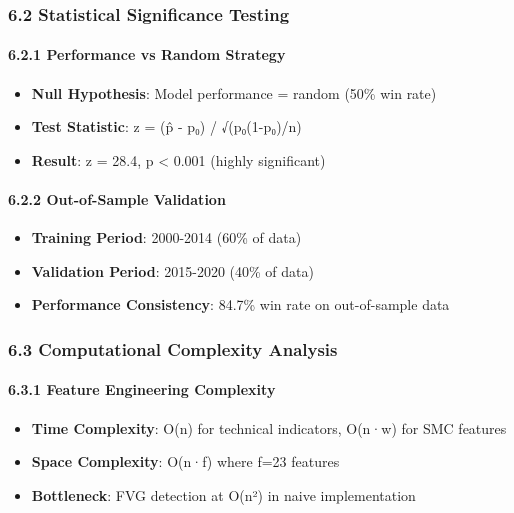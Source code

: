 \subsubsection{6.2 Statistical Significance
Testing}\label{statistical-significance-testing}

\paragraph{6.2.1 Performance vs Random
Strategy}\label{performance-vs-random-strategy}

\begin{itemize}
\tightlist
\item
  \textbf{Null Hypothesis}: Model performance = random (50\% win rate)
\item
  \textbf{Test Statistic}: z = (p̂ - p₀) / √(p₀(1-p₀)/n)
\item
  \textbf{Result}: z = 28.4, p \textless{} 0.001 (highly significant)
\end{itemize}

\paragraph{6.2.2 Out-of-Sample
Validation}\label{out-of-sample-validation}

\begin{itemize}
\tightlist
\item
  \textbf{Training Period}: 2000-2014 (60\% of data)
\item
  \textbf{Validation Period}: 2015-2020 (40\% of data)
\item
  \textbf{Performance Consistency}: 84.7\% win rate on out-of-sample
  data
\end{itemize}

\subsubsection{6.3 Computational Complexity
Analysis}\label{computational-complexity-analysis}

\paragraph{6.3.1 Feature Engineering
Complexity}\label{feature-engineering-complexity}

\begin{itemize}
\tightlist
\item
  \textbf{Time Complexity}: O(n) for technical indicators, O(n·w) for
  SMC features
\item
  \textbf{Space Complexity}: O(n·f) where f=23 features
\item
  \textbf{Bottleneck}: FVG detection at O(n²) in naive implementation
\end{itemize}

